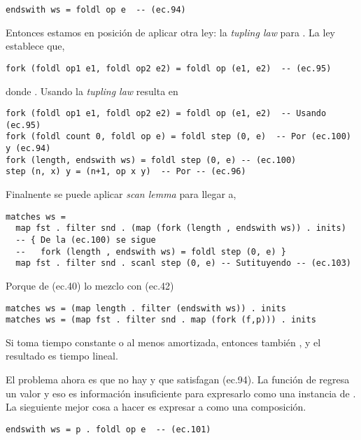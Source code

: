 \begin{verbatim}
endswith ws = foldl op e  -- (ec.94)
\end{verbatim}

Entonces estamos en posición de aplicar otra ley: la \textit{tupling law} para . La ley establece que,

\begin{verbatim}
fork (foldl op1 e1, foldl op2 e2) = foldl op (e1, e2)  -- (ec.95)
\end{verbatim}

donde . Usando la \textit{tupling law} resulta en

\begin{verbatim}
fork (foldl op1 e1, foldl op2 e2) = foldl op (e1, e2)  -- Usando (ec.95)
fork (foldl count 0, foldl op e) = foldl step (0, e)  -- Por (ec.100) y (ec.94)
fork (length, endswith ws) = foldl step (0, e) -- (ec.100)
step (n, x) y = (n+1, op x y)  -- Por -- (ec.96)
\end{verbatim}

Finalnente se puede aplicar \textit{scan lemma} para llegar a,
\begin{verbatim}
matches ws =
  map fst . filter snd . (map (fork (length , endswith ws)) . inits)
  -- { De la (ec.100) se sigue 
  --   fork (length , endswith ws) = foldl step (0, e) }
  map fst . filter snd . scanl step (0, e) -- Sutituyendo -- (ec.103)
\end{verbatim}

Porque de (ec.40) lo mezclo con (ec.42)
\begin{verbatim}
matches ws = (map length . filter (endswith ws)) . inits
matches ws = (map fst . filter snd . map (fork (f,p))) . inits
\end{verbatim}

Si  toma tiempo constante o al menos amortizada, entonces también , y el resultado es tiempo lineal.

El problema ahora es que no hay  y  que satisfagan (ec.94). La función de 
regresa un valor  y eso es información insuficiente para expresarlo como una instancia de
.
La sieguiente mejor cosa a hacer es expresar a  como una composición.

\begin{verbatim}
endswith ws = p . foldl op e  -- (ec.101)
\end{verbatim}

